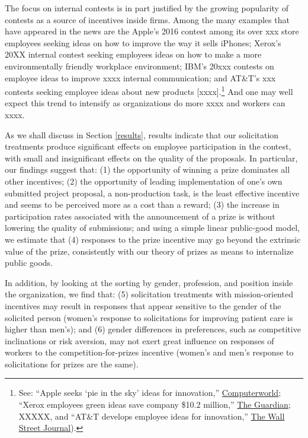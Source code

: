 \documentclass[12pt, titlepage]{article}
\begin{document}
The focus on internal contests is in part justified by the growing
popularity of contests as a source of incentives inside firms. Among the
many examples that have appeared in the news are the Apple's 2016
contest among its over xxx store employees seeking ideas on how to
improve the way it sells iPhones; Xerox's 20XX internal contest seeking
employees ideas on how to make a more environmentally friendly workplace
environment; IBM's 20xxx contests on employee ideas to improve xxxx
internal communication; and AT\&T's xxx contests seeking employee ideas
about new products {[}xxxx{]}.\footnote{See: ``Apple seeks `pie in the
  sky' ideas for innovation,''
  \href{http://www.computerworld.com/article/2474058/smartphones/apple-seeks--pie-in-the-sky--ideas-for-innovation}{Computerworld};
  ``Xerox employees green ideas save company \$10.2 million,''
  \href{http://www.theguardian.com/sustainable-business/xerox-employees-green-ideas-save}{The
  Guardian}; XXXXX, and ``AT\&T develops employee ideas for
  innovation,''
  \href{http://blogs.wsj.com/cio/2014/11/12/att-develops-employee-ideas-for-innovation}{The
  Wall Street Journal}).} And one may well expect this trend to
intensify as organizations do more xxxx and workers can xxxx.

As we shall discuss in Section \ref{results}, results indicate that our
solicitation treatments produce significant effects on employee
participation in the contest, with small and insignificant effects on
the quality of the proposals. In particular, our findings suggest that:
(1) the opportunity of winning a prize dominates all other incentives;
(2) the opportunity of leading implementation of one's own submitted
project proposal, a non-production task, is the least effective
incentive and seems to be perceived more as a cost than a reward; (3)
the increase in participation rates associated with the announcement of
a prize is without lowering the quality of submissions; and using a
simple linear public-good model, we estimate that (4) responses to the
prize incentive may go beyond the extrinsic value of the prize,
consistently with our theory of prizes as means to internalize public
goods.

In addition, by looking at the sorting by gender, profession, and
position inside the organization, we find that: (5) solicitation
treatments with mission-oriented incentives may result in responses that
appear sensitive to the gender of the solicited person (women's response
to solicitations for improving patient care is higher than men's); and
(6) gender differences in preferences, such as competitive inclinations
or risk aversion, may not exert great influence on responses of workers
to the competition-for-prizes incentive (women's and men's response to
solicitations for prizes are the same).
\end{document}
